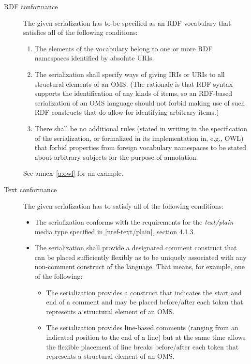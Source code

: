 \documentclass[10pt, a4paper]{isov2}
\makeatletter
\newcommand*{\eg}{e.g.\@\xspace}
\newcommand*\CommentAuthor{}
\renewcommand*\CommentAuthor{#1}}
\newcommand*\CommentDate{}
\renewcommand*\CommentDate{#1}}
\newcommand*\CommentId{}
\renewcommand*\CommentId{#1}}
\newcommand*\CommentType{}
\renewcommand*\CommentType{#1}}
\newcommand*{\SetCommentColorByType}[1]{%
\edef\localType{{#1}}%
\expandafter\ifstrequal\localType{q-aut}{\colorlet{CommentColor}{red}}{%
\expandafter\ifstrequal\localType{q-all}{\colorlet{CommentColor}{orange}}{%
\expandafter\ifstrequal\localType{todo}{\colorlet{CommentColor}{orange}}{%
\expandafter\ifstrequal\localType{fyi}{\colorlet{CommentColor}{lightgray}}{%
\colorlet{CommentColor}{yellow}}}}}}
\newcommand*{\SetCommentPrefixByType}[1]{%
\edef\localType{{#1}}%
\expandafter\@ifmtarg\localType{%
\edef\CommentPrefix{}%
}{%
\caseupper[q]{#1}%
\edef\CommentPrefix{\thestring: }%
}}
\newcommand*{\initComment}[1]{%
\setkeys{Comment}{#1}%
\SetCommentColorByType{\CommentType}%
\relax%
\SetCommentPrefixByType{\CommentType}%
\relax%
}
\newcommand*{\todonote}[2][]{%
\initComment{#1}%
\pdfcomment[author=\CommentAuthor,color=CommentColor,date=\CommentDate,id=\CommentId]{%
\CommentPrefix
#2}}
\renewcommand*{\todonote}[2][]{%
\initComment{#1}%
\ednote{\CommentPrefix #2}}
\newcommand*{\mimetype}[1]{\textit{#1}}
\renewcommand{\noterefname}{note}
\renewcommand{\nref}[1]{\noterefname~\ref{#1}}
\renewcommand{\nref}[1]{\ref{nref-#1}}
\makeatother
\begin{document}
\begin{description}
\item[RDF conformance]
The given serialization has to be specified as an RDF vocabulary that
 satisfies all of the following conditions:
\begin{enumerate}
\item The elements of the vocabulary belong to one or more RDF namespaces
 identified by absolute URIs.
\item\label{it:ids-for-structure} The serialization shall specify ways of giving IRIs or URIs to all structural elements of an OMS. (The  rationale is that RDF syntax supports the identification of any kinds of items, so an RDF-based serialization of an OMS language should not forbid making use of such RDF constructs that do allow for identifying arbitrary items.)
\item There shall be no additional rules (stated in writing in the specification of the serialization, or formalized in its implementation in, e.g., OWL) that forbid properties from foreign vocabulary namespaces to be stated about arbitrary subjects for the purpose of annotation.
\end{enumerate}

See annex~\ref{a:owl} for an example.


\item[Text conformance]
The given serialization has to satisfy all of the following conditions:
\begin{itemize}
\item The serialization conforms with the requirements for the \mimetype{text/plain} media type specified in \nref{text/plain}, section 4.1.3.
\item The serialization shall provide a designated comment construct that can be placed sufficiently flexibly as to be uniquely associated with any non-comment construct of the language.  That means, for example, one of the following:
  \begin{itemize}
  \item The serialization provides a construct that indicates the start and end of a comment and may be placed before/after each token that represents a structural element of an OMS.
  \item The serialization provides line-based comments (ranging from an indicated position to the end of a line) but at the same time allows the flexible placement of line breaks before/after each token that represents a structural element of an OMS.
  \end{itemize}
\end{itemize}


\end{description}
\end{document}
